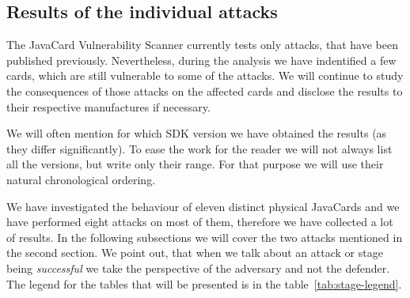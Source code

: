 \documentclass{../llncs/llncs}
\begin{document}

    \subsection{Results of the individual attacks}

        The JavaCard Vulnerability Scanner currently tests only attacks, that have been published previously. Nevertheless, during the analysis we have indentified a few cards, which are still vulnerable to some of the attacks. We will continue to study the consequences of those attacks on the affected cards and disclose the results to their respective manufactures if necessary.



        We will often mention for which SDK version we have obtained the results (as they differ significantly). To ease the work for the reader we will not always list all the versions, but write only their range. For that purpose we will use their natural chronological ordering.%

        We have investigated the behaviour of eleven distinct physical JavaCards and we have performed eight attacks on most of them, therefore we have collected a lot of results. In the following subsections we will cover the two attacks mentioned in the second section. We point out, that when we talk about an attack or stage being \textit{successful} we take the perspective of the adversary and not the defender. The legend for the tables that will be presented is in the table~\ref{tab:stage-legend}.

\setlength{\tabcolsep}{.5pt}
\renewcommand{\arraystretch}{.20}
\setlength{\floatsep}{0pt}

\begin{table}[htb]
    \captionsetup{font=footnotesize}
    \parbox[b][][b]{.45\linewidth}{
        
    }
    \hfill
    \parbox[b][][b]{.45\linewidth}{
        
    }
\end{table}
\end{document}
